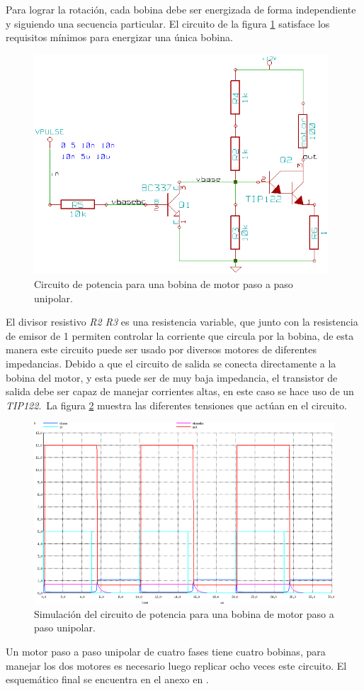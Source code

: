 Para lograr la rotaci\'on, cada bobina debe ser energizada de forma
independiente y siguiendo una secuencia particular. El circuito de la figura
\ref{fig:cir_single_coil} satisface los requisitos m\'inimos para energizar una
\'unica bobina.

\begin{figure}[htp]
\centering
\includegraphics[width=11cm]{./img/cir_single_coil.png}
\caption{Circuito de potencia para una bobina de motor paso a paso unipolar.}
\label{fig:cir_single_coil}
\end{figure}

El divisor resistivo \emph{R2 R3} es una resistencia variable, que junto con
la resistencia de emisor de 1 \ohm \@ permiten controlar la corriente que
circula
por la bobina, de esta manera este circuito puede ser usado por diversos
motores de diferentes impedancias. Debido a que el circuito de salida se
conecta directamente a la bobina del motor, y esta puede ser de muy baja
impedancia, el transistor de salida debe ser capaz de manejar corrientes altas,
en este caso se hace uso de un \emph{TIP122}.\
La figura \ref{fig:cir_single_coil_plot} muestra las diferentes tensiones que
act\'uan en el circuito. 

\begin{figure}[htp]
\centering
\includegraphics[width=15cm]{./img/cir_single_coil_plot.png}
\caption{Simulaci\'on del circuito de potencia para una bobina de motor paso a
paso unipolar.}
\label{fig:cir_single_coil_plot}
\end{figure}

Un motor paso a paso unipolar de cuatro fases tiene cuatro bobinas, para
manejar los dos motores es necesario luego replicar ocho veces este circuito.
El esquem\'atico final se encuentra en el anexo en
.\\

